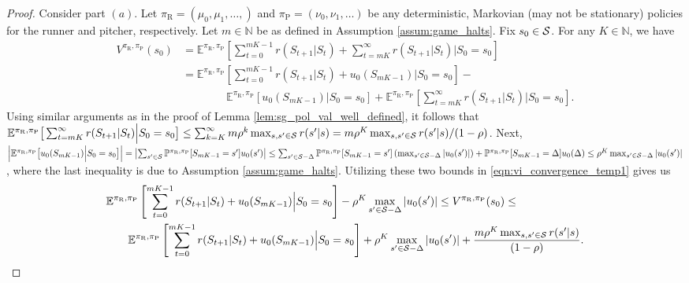 \documentclass[11pt]{article}
\newcommand{\abs}[1]{\left\lvert#1\right\rvert}
\begin{document}
       \begin{proof}
           Consider part $(a)$.  Let $\pi_\text{R} = (\mu_0,\mu_1,\ldots,)$ and $\pi_\text{P} = (\nu_0,\nu_1,\ldots)$ be any  deterministic, Markovian (may not be stationary) policies for the runner and pitcher, respectively. Let $m \in \mathbb{N}$ be as defined in Assumption \ref{assum:game_halts}. Fix $s_0 \in {\cal S}$. For any $K \in \mathbb{N}$, we have
           \begingroup
           \allowdisplaybreaks
           \begin{align}
           \nonumber
               V^{\pi_\text{R},\pi_\text{P}}(s_0) &= \mathbb{E}^{\pi_\text{R},\pi_\text{P}}\left[\sum_{t=0}^{mK-1} r(S_{t+1}|S_t) + \sum_{t=mK}^\infty r(S_{t+1}|S_t) \Big| S_0 = s_0\right]\\
               \nonumber
               &= \mathbb{E}^{\pi_\text{R},\pi_\text{P}}\left[\sum_{t=0}^{mK-1} r(S_{t+1}|S_t) + u_0(S_{mK-1}) \Big| S_0 = s_0\right] -\\           \label{eqn:vi_convergence_temp1}
               &\qquad \qquad \mathbb{E}^{\pi_\text{R},\pi_\text{P}}\left[ u_0(S_{mK-1})\Big| S_0 = s_0\right] + \mathbb{E}^{\pi_\text{R},\pi_\text{P}}\left[\sum_{t=mK}^\infty r(S_{t+1}|S_t) \Big| S_0 = s_0\right].
           \end{align}
           \endgroup
           Using similar arguments as in the proof of Lemma \ref{lem:sg_pol_val_well_defined}, it follows that $\mathbb{E}^{\pi_\text{R},\pi_\text{P}}\big[\sum_{t=mK}^\infty r(S_{t+1}|S_t) \Big| S_0 = s_0\big] \leq \sum_{k=K}^\infty m \rho^k \max_{s,s' \in {\cal S}}r(s'|s) = m\rho^K\max_{s,s' \in {\cal S}}r(s'|s)/(1-\rho)$. Next, $\abs{\mathbb{E}^{\pi_\text{R},\pi_\text{P}}\big[ u_0(S_{mK-1})\Big| S_0 = s_0\big]} = \abs{\sum_{s' \in {\cal S}}\mathbb{P}^{\pi_\text{R},\pi_\text{P}}[S_{mK-1}=s']u_0(s')} \leq \sum_{s' \in {\cal S}-\Delta}\mathbb{P}^{\pi_\text{R},\pi_\text{P}}[S_{mK-1}=s'] \left(\max_{s' \in {\cal S}-\Delta}\abs{u_0(s')}\right) + \mathbb{P}^{\pi_\text{R},\pi_\text{P}}[S_{mK-1}=\Delta]u_0(\Delta) \leq \rho^K \max_{s' \in {\cal S}-\Delta}\abs{u_0(s')}$, where the last inequality is due to Assumption \ref{assum:game_halts}. Utilizing these two bounds in \eqref{eqn:vi_convergence_temp1} gives us
           \begin{align*}
           &\mathbb{E}^{\pi_\text{R},\pi_\text{P}}\left[\sum_{t=0}^{mK-1} r(S_{t+1}|S_t) + u_0(S_{mK-1}) \Big| S_0 = s_0\right] -\rho^K \max_{s' \in {\cal S}-\Delta}\abs{u_0(s')} \leq  V^{\pi_\text{R},\pi_\text{P}}(s_0) \leq\\
           &\qquad \mathbb{E}^{\pi_\text{R},\pi_\text{P}}\left[\sum_{t=0}^{mK-1} r(S_{t+1}|S_t) + u_0(S_{mK-1}) \Big| S_0 = s_0\right] +\rho^K \max_{s' \in {\cal S}-\Delta}\abs{u_0(s')} + \frac{m\rho^K\max_{s,s' \in {\cal S}}r(s'|s)}{(1-\rho)}.

\end{align*}
\end{proof}
\end{document}
